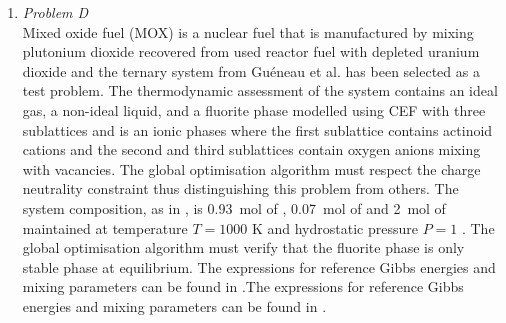 \begin{enumerate}
	\item	\emph{Problem D}\\
		Mixed oxide fuel (MOX) is a nuclear fuel that is manufactured by mixing plutonium dioxide recovered from used reactor fuel with depleted uranium dioxide and the  ternary system from Gu\'{e}neau et al. \cite{Gueneau11,Gueneau:2021aa} has been selected as a test problem. The thermodynamic assessment of the system contains an ideal gas, a non-ideal liquid,  and a  fluorite phase modelled using CEF with three sublattices and is an ionic phases where the first sublattice contains actinoid cations and the second and third sublattices contain oxygen anions mixing with vacancies. The global optimisation algorithm must respect the charge neutrality constraint thus distinguishing this problem from others. The system composition, as in \cite{Piro16}, is \SI{0.93}{\mole} of , \SI{0.07}{\mole} of  and \SI{2}{\mole} of  maintained at temperature $T = 1000$ \si{\kelvin} and hydrostatic pressure $P=1$ \si{\atmosphere}. The global optimisation algorithm must verify that the  fluorite phase is only stable phase at equilibrium. The expressions for reference Gibbs energies and mixing parameters can be found in \cite{Gueneau11}.The expressions for reference Gibbs energies and mixing parameters can be found in \cite{Liu:2015aa}.
		

\end{enumerate}

